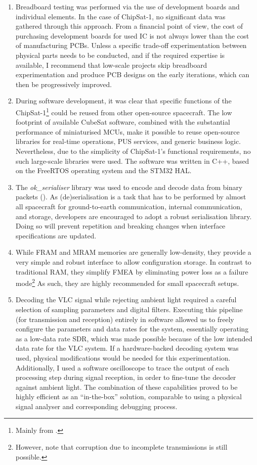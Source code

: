 \documentclass[a4paper,nobib,justified,final]{tufte-book}
\begin{document}
\begin{enumerate}[itemsep=-1ex]
	\item Breadboard testing was performed via the use of development boards and individual elements. In the case of ChipSat-1, no significant data was gathered through this approach. From a financial point of view, the cost of purchasing development boards for used \acs{IC} is not always lower than the cost of manufacturing \acsp{PCB}. Unless a specific trade-off experimentation between physical parts needs to be conducted, and if the required expertise is available, I recommend that low-scale projects skip breadboard experimentation and produce \acs{PCB} designs on the early iterations, which can then be progressively improved.
	\item During software development, it was clear that specific functions of the ChipSat-1\footnote{Mainly from .} could be reused from other open-source spacecraft. The low footprint of available CubeSat software, combined with the substantial performance of miniaturised \acsp{MCU}, make it possible to reuse open-source libraries for real-time operations, \acs{PUS} services, and generic business logic. Nevertheless, due to the simplicity of ChipSat-1's functional requirements, no such large-scale libraries were used. The software was written in C++, based on the FreeRTOS operating system and the STM32 \acs{HAL}.
	\item The \emph{ok\_serialiser} library was used to encode and decode data from binary packets (). As (de)serialisation is a task that has to be performed by almost all spacecraft for ground-to-earth communication, internal communication, and storage, developers are encouraged to adopt a robust serialisation library. Doing so will prevent repetition and breaking changes when interface specifications are updated.
	\item While \acs{FRAM} and \acs{MRAM} memories are generally low-density, they provide a very simple and robust interface to allow configuration storage. In contrast to traditional \acs{RAM}, they simplify \acf{FMEA} by eliminating power loss as a failure mode\footnote{However, note that corruption due to incomplete transmissions is still possible.} As such, they are highly recommended for small spacecraft setups.
	\item Decoding the \acs{VLC} signal while rejecting ambient light required a careful selection of sampling parameters and digital filters. Executing this pipeline (for transmission and reception) entirely in software allowed us to freely configure the parameters and data rates for the system, essentially operating as a low-data rate \acf{SDR}, which was made possible because of the low intended data rate for the \acs{VLC} system. If a hardware-backed decoding system was used, physical modifications would be needed for this experimentation. Additionally, I used a software oscilloscope to trace the output of each processing step during signal reception, in order to fine-tune the decoder against ambient light. The combination of these capabilities proved to be highly efficient as an ``in-the-box'' solution, comparable to using a physical signal analyser and corresponding debugging process.
\end{enumerate}
\end{document}

